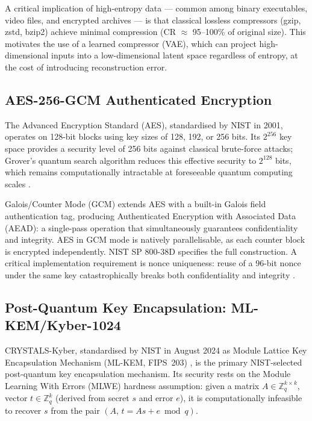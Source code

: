 \documentclass[twocolumn]{article}
\begin{document}
A critical implication of high-entropy data --- common among binary executables,
video files, and encrypted archives --- is that classical lossless compressors
(gzip, zstd, bzip2) achieve minimal compression (CR $\approx$ 95--100\% of
original size). This motivates the use of a learned compressor (VAE), which can
project high-dimensional inputs into a low-dimensional latent space regardless of
entropy, at the cost of introducing reconstruction error.

\subsection{AES-256-GCM Authenticated Encryption}

The Advanced Encryption Standard (AES), standardised by NIST in 2001, operates
on 128-bit blocks using key sizes of 128, 192, or 256 bits. Its $2^{256}$ key
space provides a security level of 256 bits against classical brute-force attacks;
Grover's quantum search algorithm reduces this effective security to $2^{128}$
bits, which remains computationally intractable at foreseeable quantum computing
scales \cite{grover1996}.

Galois/Counter Mode (GCM) extends AES with a built-in Galois field authentication
tag, producing Authenticated Encryption with Associated Data (AEAD): a
single-pass operation that simultaneously guarantees confidentiality and integrity.
AES in GCM mode is natively parallelisable, as each counter block is encrypted
independently. NIST SP 800-38D \cite{dworkin2007} specifies the full construction.
A critical implementation requirement is nonce uniqueness: reuse of a 96-bit
nonce under the same key catastrophically breaks both confidentiality and
integrity \cite{aviram2016}.

\subsection{Post-Quantum Key Encapsulation: ML-KEM/Kyber-1024}

CRYSTALS-Kyber, standardised by NIST in August 2024 as Module Lattice Key
Encapsulation Mechanism (ML-KEM, FIPS~203) \cite{fips203}, is the primary
NIST-selected post-quantum key encapsulation mechanism. Its security rests on the
Module Learning With Errors (MLWE) hardness assumption: given a matrix $A \in
\mathbb{Z}_q^{k \times k}$, vector $t \in \mathbb{Z}_q^k$ (derived from secret
$s$ and error $e$), it is computationally infeasible to recover $s$ from the pair
$(A,\,t = As + e \bmod q)$.
\end{document}
